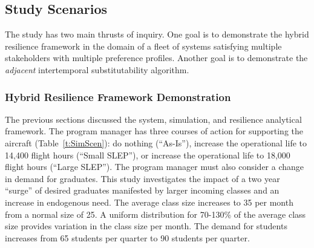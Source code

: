 \documentclass[preprint,12pt]{elsarticle}
\begin{document}
\subsection{Study Scenarios}

The study has two main thrusts of inquiry. One goal is to demonstrate
the hybrid resilience framework in the domain of a fleet of systems
satisfying multiple stakeholders with multiple preference
profiles. Another goal is to demonstrate the \emph{adjacent}
intertemporal substitutability algorithm.

\subsubsection{Hybrid Resilience Framework Demonstration}

The previous sections discussed the system, simulation, and resilience
analytical framework. The program manager has three courses of action
for supporting the aircraft (Table~\ref{t:SimScen}): do nothing
(``As-Is''), increase the operational life to 14,400 flight hours
(``Small SLEP''), or increase the operational life to 18,000 flight
hours (``Large SLEP''). The program manager must also consider a
change in demand for graduates. This study investigates the impact of
a two year ``surge'' of desired graduates manifested by larger
incoming classes and an increase in endogenous need. The average class
size increases to 35 per month from a normal size of 25. A uniform
distribution for 70-130\% of the average class size 
provides variation in the class size per month. The demand
for students increases from 65 students per quarter to 90 students per
quarter. 

\begin{table}[h]
    \caption{SLEP Courses of Action}
  \label{t:SimScen}
\end{table}
\end{document}
